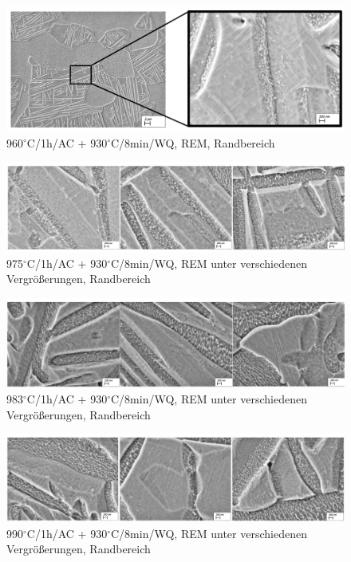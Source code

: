 \begin{figure}
	\centering
	\includegraphics[width=1.0\linewidth]{./Bilder/Abbildung 10}
	\caption[Abbildung 10]{960$^\circ$C/1h/AC + 930$^\circ$C/8min/WQ, REM, Randbereich}
	\label{fig:abbildung-10}
\end{figure}

\begin{figure}
	\centering
	\includegraphics[width=1.0\linewidth]{./Bilder/Abbildung 11}
	\caption[Abbildung 11]{975$^\circ$C/1h/AC + 930$^\circ$C/8min/WQ, REM unter verschiedenen Vergrößerungen, Randbereich}
	\label{fig:abbildung-11}
\end{figure}

\begin{figure}
	\centering
	\includegraphics[width=1.0\linewidth]{./Bilder/Abbildung 12}
	\caption[Abbildung 12]{983$^\circ$C/1h/AC + 930$^\circ$C/8min/WQ, REM unter verschiedenen Vergrößerungen, Randbereich}
	\label{fig:abbildung-12}
\end{figure}

\begin{figure}
	\centering
	\includegraphics[width=1.0\linewidth]{./Bilder/Abbildung 13}
	\caption[Abbildung 13]{990$^\circ$C/1h/AC + 930$^\circ$C/8min/WQ, REM unter verschiedenen Vergrößerungen, Randbereich}
	\label{fig:abbildung-13}
\end{figure}

